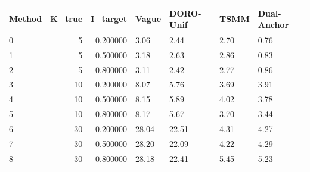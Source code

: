\begin{tabular}{lrrllll}
\toprule
Method & K_true & I_target & Vague & DORO-Unif & TSMM & Dual-Anchor \\
\midrule
0 & 5 & 0.200000 & 3.06 & 2.44 & 2.70 & 0.76 \\
1 & 5 & 0.500000 & 3.18 & 2.63 & 2.86 & 0.83 \\
2 & 5 & 0.800000 & 3.11 & 2.42 & 2.77 & 0.86 \\
3 & 10 & 0.200000 & 8.07 & 5.76 & 3.69 & 3.91 \\
4 & 10 & 0.500000 & 8.15 & 5.89 & 4.02 & 3.78 \\
5 & 10 & 0.800000 & 8.17 & 5.67 & 3.70 & 3.44 \\
6 & 30 & 0.200000 & 28.04 & 22.51 & 4.31 & 4.27 \\
7 & 30 & 0.500000 & 28.20 & 22.09 & 4.22 & 4.29 \\
8 & 30 & 0.800000 & 28.18 & 22.41 & 5.45 & 5.23 \\
\bottomrule
\end{tabular}


